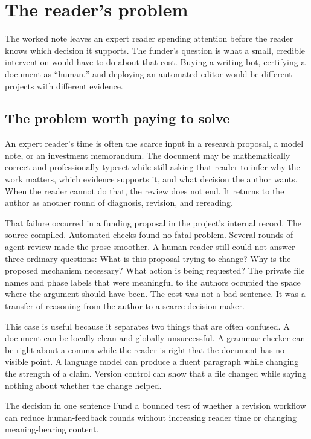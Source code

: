 \chapter{The reader's problem}
\label{ch:decision}

The worked note leaves an expert reader spending attention before the reader
knows which decision it supports. The funder's question is what a small,
credible intervention would have to do about that cost. Buying a writing bot,
certifying a document as ``human,'' and deploying an automated editor would be
different projects with different evidence.

\section{The problem worth paying to solve}

An expert reader's time is often the scarce input in a research proposal, a
model note, or an investment memorandum. The document may be mathematically
correct and professionally typeset while still asking that reader to infer why
the work matters, which evidence supports it, and what decision the author
wants. When the reader cannot do that, the review does not end. It returns to
the author as another round of diagnosis, revision, and rereading.

That failure occurred in a funding proposal in the project's internal record.
The source compiled. Automated checks found no fatal problem. Several rounds
of agent review made the prose smoother. A human reader still could not answer
three ordinary questions: What is this proposal trying to change? Why is the
proposed mechanism necessary? What action is being requested? The private file
names and phase labels that were meaningful to the authors occupied the space
where the argument should have been. The cost was not a bad sentence. It was a
transfer of reasoning from the author to a scarce decision maker.

This case is useful because it separates two things that are often confused. A
document can be locally clean and globally unsuccessful. A grammar
checker can be right about a comma while the reader is right that the document
has no visible point. A language model can produce a fluent paragraph while
changing the strength of a claim. Version control can show that a file changed
while saying nothing about whether the change helped.

\begin{takeawaybox}{The decision in one sentence}
Fund a bounded test of whether a revision workflow can reduce human-feedback
rounds without increasing reader time or changing meaning-bearing content.
\end{takeawaybox}

